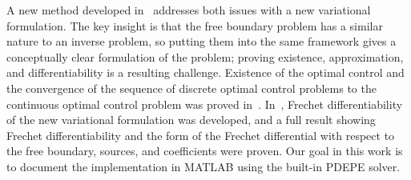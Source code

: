 \documentclass[letterpaper, 10pt]{amsart}
\theoremstyle{definition}
\theoremstyle{remark}
\begin{document}
A new method developed in~\cite{abdulla13,abdulla15} addresses both issues with a new variational formulation.
The key insight is that the free boundary problem has a similar nature to an inverse problem, so putting them into the same framework gives a conceptually clear formulation of the problem; proving existence, approximation, and differentiability is a resulting challenge.
Existence of the optimal control and the convergence of the sequence of discrete
optimal control problems to the continuous optimal control problem was proved
in~\cite{abdulla13,abdulla15}.
In~\cite{abdulla16,abdulla17}, Frechet differentiability of the new variational
formulation was developed, and a full result showing Frechet differentiability
and the form of the Frechet differential
with respect to the free boundary, sources, and coefficients were proven.
Our goal in this work is to document the implementation in MATLAB using the built-in PDEPE solver.
\end{document}
